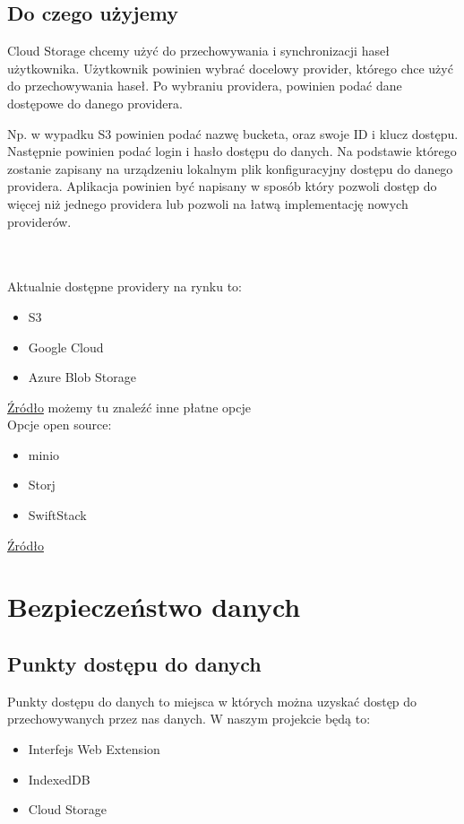 \documentclass[11pt, a4paper]{article}
\begin{document}
\subsection{Do czego użyjemy}
\begin{paragraph}
    Cloud Storage chcemy użyć do przechowywania i synchronizacji haseł użytkownika.
    Użytkownik powinien wybrać docelowy provider, którego chce użyć do przechowywania haseł.
    Po wybraniu providera, powinien podać dane dostępowe do danego providera.

    Np. w wypadku S3 powinien podać nazwę bucketa, oraz swoje ID i klucz dostępu.
    Następnie powinien podać login i hasło dostępu do danych.
    Na podstawie którego zostanie zapisany na urządzeniu lokalnym plik konfiguracyjny dostępu do danego providera.
    Aplikacja powinien być napisany w sposób który pozwoli dostęp do więcej niż jednego providera lub pozwoli na łatwą implementację nowych providerów.
\end{paragraph} \\\\
Aktualnie dostępne providery na rynku to:
\begin{itemize}
    \item S3
    \item Google Cloud 
    \item Azure Blob Storage
\end{itemize}
\href{https://www.digitalocean.com/resources/articles/amazon-s3-alternatives}{Źródło} możemy tu znaleźć inne płatne opcje \\

Opcje open source:
\begin{itemize}
    \item minio
    \item Storj
    \item SwiftStack
\end{itemize}
\href{https://opensourcealternative.to/alternativesto/amazon-s3}{Źródło}

\newpage

\section{Bezpieczeństwo danych}

\subsection{Punkty dostępu do danych}
Punkty dostępu do danych to miejsca w których można uzyskać dostęp do przechowywanych przez nas danych.
W naszym projekcie będą to:
\begin{itemize}
    \item Interfejs Web Extension
    \item IndexedDB
    \item Cloud Storage
\end{itemize}
\end{document}
